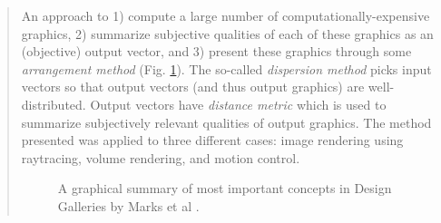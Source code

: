 		\begin{quote}
		\small
		An approach to 
		1) compute a large number of computationally-expensive graphics,
		2) summarize subjective qualities of each of these graphics as an (objective) output vector, and
		3) present these graphics through some \emph{arrangement method} (Fig. \ref{fig:marks1997design}).
		The so-called \emph{dispersion method} picks input vectors so that output vectors (and thus
		output graphics) are well-distributed. Output vectors have \emph{distance metric} which is used
		to summarize subjectively relevant qualities of output graphics. 
		The method presented was applied to three different cases:
		image rendering using raytracing,
		volume rendering, and
		motion control.
		
		\begin{figure}[h!]
		\centering
		
		\caption{A graphical summary of most important concepts in Design Galleries by Marks et al \cite{marks1997design}.}
		\label{fig:marks1997design}
		\end{figure}
		
		\end{quote}



